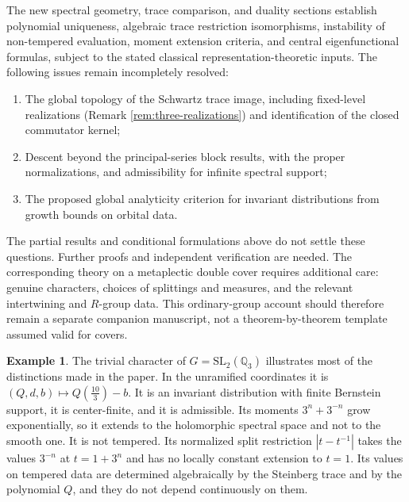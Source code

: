 \documentclass[12pt,letterpaper]{amsart}
\numberwithin{equation}{section}
\theoremstyle{definition}
\newtheorem*{example*}{Example}
\theoremstyle{remark}
\begin{document}
The new spectral geometry, trace comparison, and duality sections establish polynomial uniqueness, algebraic trace restriction isomorphisms, instability of non-tempered evaluation, moment extension criteria, and central eigenfunctional formulas, subject to the stated classical representation-theoretic inputs. The following issues remain incompletely resolved:
\begin{enumerate}[label=\arabic*.,leftmargin=*]
\item The global topology of the Schwartz trace image, including fixed-level realizations (Remark \ref{rem:three-realizations}) and identification of the closed commutator kernel;
\item Descent beyond the principal-series block results, with the proper normalizations, and admissibility for infinite spectral support;
\item The proposed global analyticity criterion for invariant distributions from growth bounds on orbital data.
\end{enumerate}
The partial results and conditional formulations above do not settle these questions. Further proofs and independent verification are needed. The corresponding theory on a metaplectic double cover requires additional care: genuine characters, choices of splittings and measures, and the relevant intertwining and $R$-group data. This ordinary-group account should therefore remain a separate companion manuscript, not a theorem-by-theorem template assumed valid for covers.
\begin{example*}
The trivial character of $G=\mathrm{SL}_2(\mathbb Q_3)$ illustrates most of the distinctions made in the paper. In the unramified coordinates it is $(Q,d,b)\mapsto Q(\tfrac{10}3)-b$. It is an invariant distribution with finite Bernstein support, it is center-finite, and it is admissible. Its moments $3^n+3^{-n}$ grow exponentially, so it extends to the holomorphic spectral space and not to the smooth one. It is not tempered. Its normalized split restriction $|t-t^{-1}|$ takes the values $3^{-n}$ at $t=1+3^n$ and has no locally constant extension to $t=1$. Its values on tempered data are determined algebraically by the Steinberg trace and by the polynomial $Q$, and they do not depend continuously on them.
\end{example*}
\end{document}
